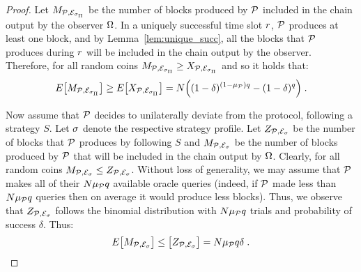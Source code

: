 \begin{proof}
Let $M_{\mathcal{P},\mathcal{E}_{\sigma_\Pi}}$ be the number of blocks produced by $\mathcal{P}$ included in the chain output by the observer $\Omega$. In a uniquely successful time slot $r$, $\mathcal{P}$ produces at least one block, and by Lemma~\ref{lem:unique_succ}, all the blocks that $\mathcal{P}$ produces during $r$ will be included in the chain output by the observer. Therefore, for all random coins $M_{\mathcal{P},\mathcal{E}_{\sigma_\Pi}}\geq X_{\mathcal{P},\mathcal{E}_{\sigma_\Pi}}$ and so it holds that:
\begin{equation}\label{eq:lower_bound}
    E\big[M_{\mathcal{P},\mathcal{E}_{\sigma_\Pi}}\big]\geq E\big[X_{\mathcal{P},\mathcal{E}_{\sigma_\Pi}}\big]=N\Big((1-\delta)^{(1-\mu_{\mathcal{P}}) q}-(1-\delta)^q\Big)\;.
\end{equation}

Now assume that $\mathcal{P}$ decides to unilaterally deviate from the protocol, following a strategy $S$. Let $\sigma$ denote the respective strategy profile.
    Let $Z_{\mathcal{P},\mathcal{E}_\sigma}$ be the number of blocks that $\mathcal{P}$ produces by following $S$ and $M_{\mathcal{P},\mathcal{E}_\sigma}$ be the number of blocks produced by $\mathcal{P}$ that will be included in the chain output by $\Omega$. Clearly, for all random coins $M_{\mathcal{P},\mathcal{E}_\sigma}\leq Z_{\mathcal{P},\mathcal{E}_\sigma}$. Without loss of generality, we may assume that $\mathcal{P}$ makes all of their $N\mu_{\mathcal{P}} q$ available oracle queries (indeed, if $\mathcal{P}$ made less than $N\mu_{\mathcal{P}} q$ queries then on average it would produce less blocks). Thus, we observe that $Z_{\mathcal{P},\mathcal{E}_\sigma}$ follows the binomial distribution with $N\mu_{\mathcal{P}} q$ trials and probability of success $\delta$. Thus:
\begin{equation}\label{eq:upper_bound}
    E\big[M_{\mathcal{P},\mathcal{E}_\sigma}\big]\leq\big[Z_{\mathcal{P},\mathcal{E}_{\sigma}}\big]=N\mu_{\mathcal{P}} q\delta\;.
\end{equation}


\end{proof}
